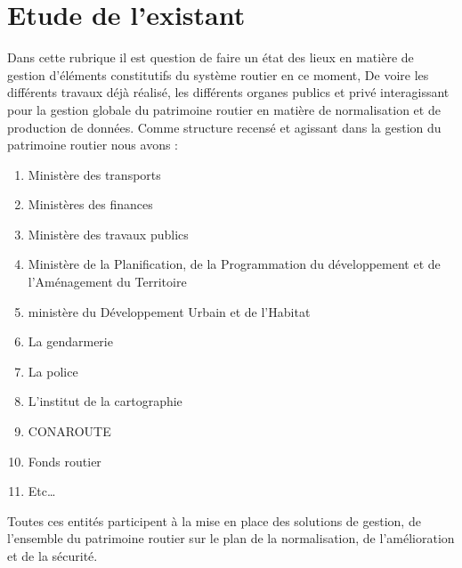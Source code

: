 
\chapter{Etude de l’existant }  %

\ifpdf
    \graphicspath{{Chapter2/Figs/Raster/}{Chapter2/Figs/PDF/}{Chapter2/Figs/}}
\else
    \graphicspath{{Chapter2/Figs/Vector/}{Chapter2/Figs/}}
\fi



Dans cette rubrique il est question de faire un état des lieux en matière de gestion d’éléments constitutifs du système routier en ce moment, De voire les différents travaux déjà réalisé, les différents organes publics et privé interagissant pour la gestion globale du patrimoine routier en matière de normalisation et de production de données. Comme structure recensé et agissant dans la gestion du patrimoine routier nous avons :
\begin{enumerate}
\item  Ministère des transports
\item  Ministères des finances
\item  Ministère des travaux publics
\item  Ministère de la Planification, de la Programmation du développement et de l'Aménagement du Territoire
\item  ministère du Développement Urbain et de l'Habitat
\item  La gendarmerie 
\item  La police
\item  L’institut de la cartographie
\item  CONAROUTE
\item  Fonds routier
\item  Etc…
\end{enumerate}
Toutes ces entités participent à la mise en place des solutions de gestion, de l’ensemble du patrimoine routier sur le plan de la normalisation, de l’amélioration et de la sécurité. 

